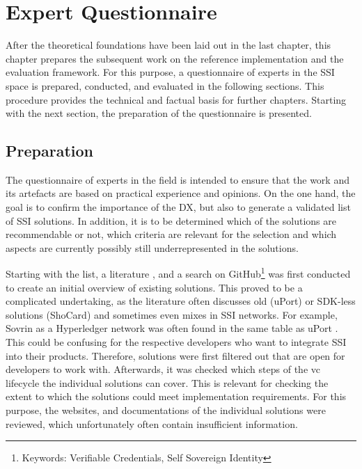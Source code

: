 
\chapter{Expert Questionnaire}\label{chapter: expert}
    
    After the theoretical foundations have been laid out in the last chapter, this chapter prepares the subsequent work on the reference implementation and the evaluation framework. For this purpose, a questionnaire of experts in the \ac{SSI} space is prepared, conducted, and evaluated in the following sections. This procedure provides the technical and factual basis for further chapters. Starting with the next section, the preparation of the questionnaire is presented.
   
    \section{Preparation}
    
    The questionnaire of experts in the field is intended to ensure that the work and its artefacts are based on practical experience and opinions. On the one hand, the goal is to confirm the importance of the \ac{DX}, but also to generate a validated list of \ac{SSI} solutions. In addition, it is to be determined which of the solutions are recommendable or not, which criteria are relevant for the selection and which aspects are currently possibly still underrepresented in the solutions.
    
    Starting with the list, a literature \cite{bouras_distributed_2020, bernabe_privacy-preserving_2019, dib_decentralized_2020, dunphy_first_2018, ferdous_search_2019, kuperberg_blockchain-based_2020, van_bokkem_self-sovereign_2019, friedewald_self-sovereign_2020,gruner_relevance_2018}, and a search on GitHub\footnote{Keywords: Verifiable Credentials, Self Sovereign Identity} was first conducted to create an initial overview of existing solutions. This proved to be a complicated undertaking, as the literature often discusses old (uPort) or SDK-less solutions (ShoCard) and sometimes even mixes in \ac{SSI} networks. For example, Sovrin as a Hyperledger network was often found in the same table as uPort \cite{bouras_distributed_2020, bernabe_privacy-preserving_2019, dib_decentralized_2020, dunphy_first_2018}. This could be confusing for the respective developers who want to integrate \ac{SSI} into their products. Therefore, solutions were first filtered out that are open for developers to work with. Afterwards, it was checked which steps of the \ac{vc} lifecycle \cite{sporny_verifiable_2019} the individual solutions can cover. This is relevant for checking the extent to which the solutions could meet implementation requirements. For this purpose, the websites, and documentations of the individual solutions were reviewed, which unfortunately often contain insufficient information.
    
